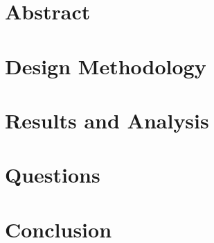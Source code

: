 \documentclass[CMPE]{KGCOEReport}
\begin{document}
\maketitle

\section*{Abstract}

\section*{Design Methodology}

\section*{Results and Analysis}

\section*{Questions}

\section*{Conclusion}
\end{document}
